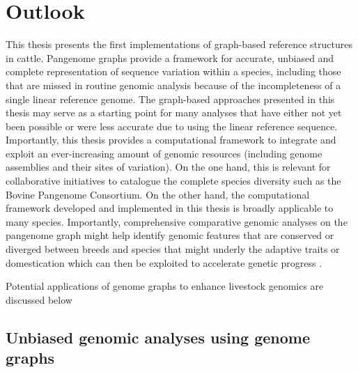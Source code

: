 \documentclass[../main.tex]{subfiles}
\begin{document}
\newpage

\section*{\LARGE{Outlook}}
{}
\thispagestyle{plain}

This thesis presents the first implementations of graph-based reference structures in cattle. Pangenome graphs provide a framework for accurate, unbiased and complete representation of sequence variation within a species, including those that are missed in routine genomic analysis because of the incompleteness of a single linear reference genome. The graph-based approaches presented in this thesis may serve as a starting point for many analyses that have either not yet been possible or were less accurate due to using the linear reference sequence. Importantly, this thesis provides a computational framework to integrate and exploit an ever-increasing amount of genomic resources (including genome assemblies and their sites of variation). On the one hand, this is relevant for collaborative initiatives to catalogue the complete species diversity such as the Bovine Pangenome Consortium. On the other hand, the computational framework developed and implemented in this thesis is broadly applicable to many species. Importantly, comprehensive comparative genomic analyses on the pangenome graph might help identify genomic features that are conserved or diverged between breeds and species that might underly the adaptive traits or domestication which can then be exploited to accelerate genetic progress \citep{foissac2019multi,clark2020faang}. 

Potential applications of genome graphs to enhance livestock genomics are discussed below

\subsection*{Unbiased genomic analyses using genome graphs}
\end{document}
